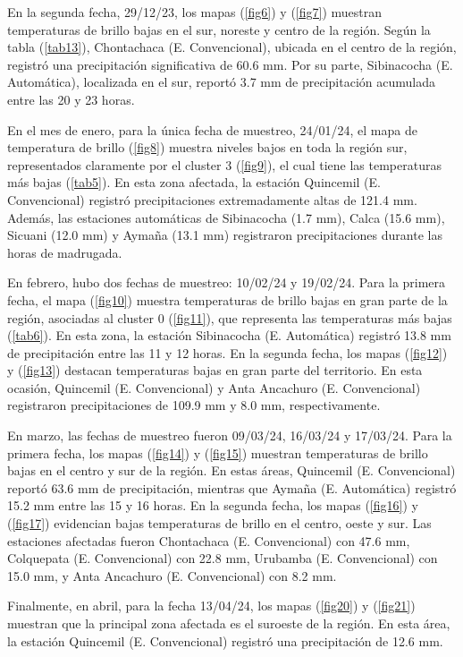 \documentclass[twocolumn]{IECEjournal} %
\begin{document}
En la segunda fecha, 29/12/23, los mapas (\ref{fig6}) y (\ref{fig7}) muestran temperaturas de brillo bajas en el sur, noreste y centro de la región. Según la tabla (\ref{tab13}), Chontachaca (E. Convencional), ubicada en el centro de la región, registró una precipitación significativa de 60.6 mm. Por su parte, Sibinacocha (E. Automática), localizada en el sur, reportó 3.7 mm de precipitación acumulada entre las 20 y 23 horas.

En el mes de enero, para la única fecha de muestreo, 24/01/24, el mapa de temperatura de brillo (\ref{fig8}) muestra niveles bajos en toda la región sur, representados claramente por el cluster 3 (\ref{fig9}), el cual tiene las temperaturas más bajas (\ref{tab5}). En esta zona afectada, la estación Quincemil (E. Convencional) registró precipitaciones extremadamente altas de 121.4 mm. Además, las estaciones automáticas de Sibinacocha (1.7 mm), Calca (15.6 mm), Sicuani (12.0 mm) y Aymaña (13.1 mm) registraron precipitaciones durante las horas de madrugada.

En febrero, hubo dos fechas de muestreo: 10/02/24 y 19/02/24. Para la primera fecha, el mapa (\ref{fig10}) muestra temperaturas de brillo bajas en gran parte de la región, asociadas al cluster 0 (\ref{fig11}), que representa las temperaturas más bajas (\ref{tab6}). En esta zona, la estación Sibinacocha (E. Automática) registró 13.8 mm de precipitación entre las 11 y 12 horas. En la segunda fecha, los mapas (\ref{fig12}) y (\ref{fig13}) destacan temperaturas bajas en gran parte del territorio. En esta ocasión, Quincemil (E. Convencional) y Anta Ancachuro (E. Convencional) registraron precipitaciones de 109.9 mm y 8.0 mm, respectivamente.

En marzo, las fechas de muestreo fueron 09/03/24, 16/03/24 y 17/03/24. Para la primera fecha, los mapas (\ref{fig14}) y (\ref{fig15}) muestran temperaturas de brillo bajas en el centro y sur de la región. En estas áreas, Quincemil (E. Convencional) reportó 63.6 mm de precipitación, mientras que Aymaña (E. Automática) registró 15.2 mm entre las 15 y 16 horas. En la segunda fecha, los mapas (\ref{fig16}) y (\ref{fig17}) evidencian bajas temperaturas de brillo en el centro, oeste y sur. Las estaciones afectadas fueron Chontachaca (E. Convencional) con 47.6 mm, Colquepata (E. Convencional) con 22.8 mm, Urubamba (E. Convencional) con 15.0 mm, y Anta Ancachuro (E. Convencional) con 8.2 mm.

Finalmente, en abril, para la fecha 13/04/24, los mapas (\ref{fig20}) y (\ref{fig21}) muestran que la principal zona afectada es el suroeste de la región. En esta área, la estación Quincemil (E. Convencional) registró una precipitación de 12.6 mm.
\end{document}
